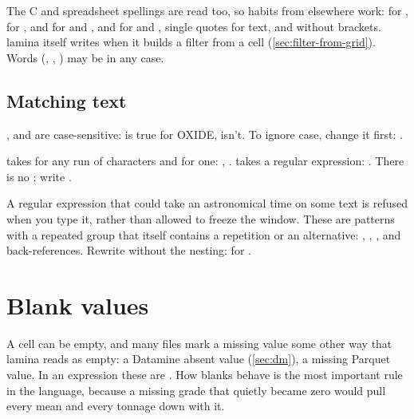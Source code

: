 The C and spreadsheet spellings are read too, so habits from elsewhere work: \code{==} for \code{=},
\code{<>} for \code{!=}, \code{\&\&} and \code{||} for  and , \code{\textasciitilde{}} and
\code{!\textasciitilde{}} for  and , single quotes for text, and 
without brackets. lamina itself writes \code{==} when it builds a filter from a cell
(\cref{sec:filter-from-grid}). Words (, , ) may be in any case.

\subsection{Matching text}\label{sec:text-match}

,  and  are case-sensitive:  is true
for OXIDE,  isn't. To ignore case, change it first:
.

 takes \code{\%} for any run of characters and \code{\_} for one: ,
.  takes a regular expression: .
There is no ; write .

A regular expression that could take an astronomical time on some text is refused when you type it,
rather than allowed to freeze the window. These are patterns with a repeated group that itself
contains a repetition or an alternative: , , , and
back-references. Rewrite without the nesting: \code{[ab]*} for .

\section{Blank values}\label{sec:blanks}

A cell can be empty, and many files mark a missing value some other way that lamina reads as empty: a
Datamine absent value (\cref{sec:dm}), a missing Parquet value. In an expression these are
. How blanks behave is the most important rule in the language, because a missing grade
that quietly became zero would pull every mean and every tonnage down with it.

